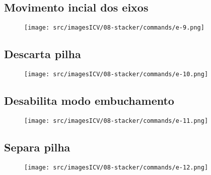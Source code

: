 \newpage
\thispagestyle{fancy}
\vspace*{40 pt}
\subsection{\small Movimento incial dos eixos}
\vspace*{\fill}
\begin{figure}[h]
    \centering
    \texttt{[image: src/imagesICV/08-stacker/commands/e-9.png]}
\end{figure}
\vspace*{\fill}

\newpage
\thispagestyle{fancy}
\vspace*{40 pt}
\subsection{\small Descarta pilha}
\vspace*{\fill}
\begin{figure}[h]
    \centering
    \texttt{[image: src/imagesICV/08-stacker/commands/e-10.png]}
\end{figure}
\vspace*{\fill}

\newpage
\thispagestyle{fancy}
\vspace*{40 pt}
\subsection{\small Desabilita modo embuchamento}
\vspace*{\fill}
\begin{figure}[h]
    \centering
    \texttt{[image: src/imagesICV/08-stacker/commands/e-11.png]}
\end{figure}
\vspace*{\fill}

\newpage
\thispagestyle{fancy}
\vspace*{40 pt}
\subsection{\small Separa pilha}
\vspace*{\fill}
\begin{figure}[h]
    \centering
    \texttt{[image: src/imagesICV/08-stacker/commands/e-12.png]}
\end{figure}
\vspace*{\fill}

